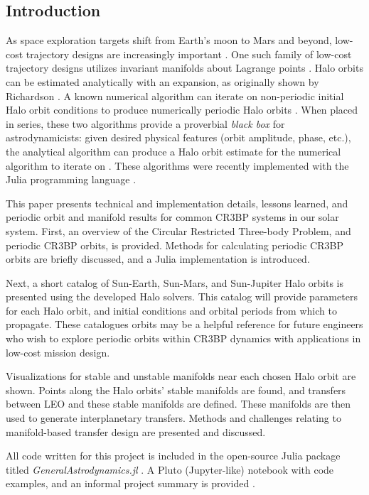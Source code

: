 \documentclass[conf]{new-aiaa}
\begin{document}
\begin{multicols*}{2}
\section{Introduction}
As space exploration targets shift from Earth's moon to Mars and 
beyond, low-cost trajectory designs are increasingly important 
\cite{nasa2020artemis}. One such family of low-cost trajectory 
designs utilizes invariant manifolds about Lagrange points
\cite{rund2018interplanetary}. Halo orbits can be estimated 
analytically with an expansion, as originally shown by Richardson 
\cite{richardson1980analytical} \cite{koon2008dynamical}. A known
numerical algorithm can iterate on non-periodic initial Halo orbit 
conditions to produce numerically periodic Halo orbits
\cite{howell1984three}. When placed in series, these two algorithms 
provide a proverbial \textit{black box} for astrodynamicists: 
given desired physical features (orbit amplitude, phase, etc.), 
the analytical algorithm can produce a Halo orbit estimate for the
numerical algorithm to iterate on \cite{rund2018interplanetary}.
These algorithms were recently implemented with the Julia 
programming language \cite{carpinelli2020halos} 
\cite{carpinelli2020astro} \cite{bezanson2017julia}. 

This paper presents technical and implementation details, lessons learned,
and periodic orbit and manifold results for common CR3BP systems in 
our solar system. 
First, an overview of the Circular Restricted Three-body Problem,
and periodic CR3BP orbits, is provided. Methods for calculating
periodic CR3BP orbits are briefly discussed, and a Julia 
implementation is introduced. 

Next, a short catalog of Sun-Earth, Sun-Mars, and Sun-Jupiter 
Halo orbits is presented using the developed Halo solvers.
This catalog will provide parameters for each Halo orbit, 
and initial conditions and orbital periods from which to propagate.
These catalogues orbits may be a helpful reference for future 
engineers who wish to explore periodic orbits within CR3BP dynamics
with applications in low-cost mission design.

Visualizations for stable and unstable 
manifolds near each chosen Halo orbit are shown. Points along the 
Halo orbits' stable manifolds are found, and 
transfers between LEO and these stable manifolds are defined. 
These manifolds are then used to generate interplanetary 
transfers. Methods and challenges relating to manifold-based 
transfer design are presented and discussed. 

All code written for this project is included in the open-source 
Julia package titled \textit{GeneralAstrodynamics.jl} \cite{carpinelli2020astro}.
A Pluto (Jupyter-like) notebook with code examples, and an informal 
project summary is provided 
\cite{fosnp2020Pluto} \cite{carpinelli2020halos}.


\end{multicols*}
\end{document}
